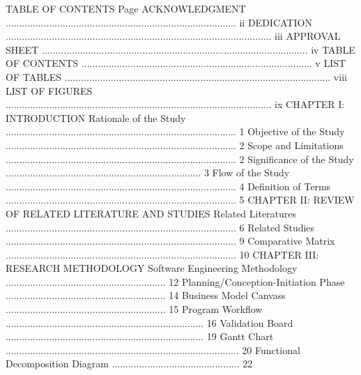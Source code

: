 TABLE OF CONTENTS
		Page
ACKNOWLEDGMENT	..................................................................................... 	        ii
DEDICATION 		.................................................................................................. 	        iii
APPROVAL SHEET	..................................................................................................	        iv
TABLE OF CONTENTS	.....................................................................................	        v
LIST OF TABLES 	.................................................................................................. 	      viii
LIST OF FIGURES 	.................................................................................................. 	        ix
CHAPTER I: INTRODUCTION 
Rationale of the Study	.....................................................................................	        1
Objective of the Study	..................................................................................... 	        2
Scope and Limitations	..................................................................................... 	        2
Significance of the Study	........................................................................ 	        3
Flow of the Study	..................................................................................... 	        4
Definition of Terms 	..................................................................................... 	        5
CHAPTER II: REVIEW OF RELATED LITERATURE AND STUDIES 
Related Literatures 	..................................................................................... 	        6
Related Studies 		..................................................................................... 	        9
Comparative Matrix 	..................................................................................... 	        10
CHAPTER III: RESEARCH METHODOLOGY 
Software Engineering Methodology 	........................................................... 	        12
Planning/Conception-Initiation Phase 	........................................................... 	        14
Business Model Canvass 	........................................................... 	        15
Program Workflow 	......................................................................... 	        16
Validation Board 	......................................................................... 	        19
Gantt Chart	...................................................................................... 	        20
Functional Decomposition Diagram 	............................................... 	        22
